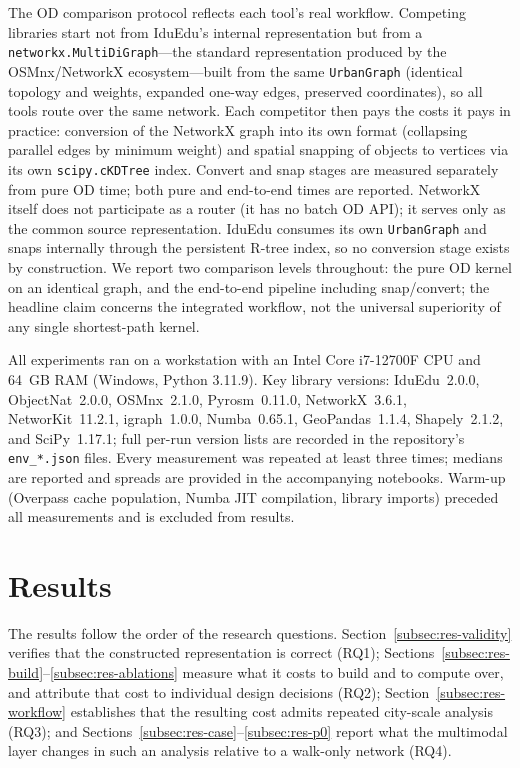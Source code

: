 \documentclass[smartcities,article,submit,moreauthors]{Definitions/mdpi}
\begin{document}
    The OD comparison protocol reflects each tool's real workflow.
    Competing libraries start not from IduEdu's internal representation but from a
    \texttt{networkx.MultiDiGraph}---the standard representation produced by the OSMnx/NetworkX
    ecosystem---built from the same \texttt{UrbanGraph} (identical topology and weights, expanded
    one-way edges, preserved coordinates), so all tools route over the same network.
    Each competitor then pays the costs it pays in practice: conversion of the NetworkX graph into its
    own format (collapsing parallel edges by minimum weight) and spatial snapping of objects to vertices
    via its own \texttt{scipy.cKDTree} index.
    Convert and snap stages are measured separately from pure OD time; both pure and end-to-end times
    are reported.
    NetworkX itself does not participate as a router (it has no batch OD API); it serves only as the
    common source representation.
    IduEdu consumes its own \texttt{UrbanGraph} and snaps internally through the persistent R-tree
    index, so no conversion stage exists by construction.
    We report two comparison levels throughout: the pure OD kernel on an identical graph, and the
    end-to-end pipeline including snap/convert; the headline claim concerns the integrated workflow, not
    the universal superiority of any single shortest-path kernel.

    All experiments ran on a workstation with an Intel Core i7-12700F CPU and 64~GB RAM (Windows,
    Python 3.11.9).
    Key library versions: IduEdu~2.0.0, ObjectNat~2.0.0, OSMnx~2.1.0, Pyrosm~0.11.0, NetworkX~3.6.1,
    NetworKit~11.2.1, igraph~1.0.0, Numba~0.65.1, GeoPandas~1.1.4, Shapely~2.1.2, and SciPy~1.17.1;
    full per-run version lists are recorded in the repository's \texttt{env\_*.json} files.
    Every measurement was repeated at least three times; medians are reported and spreads are provided
    in the accompanying notebooks.
    Warm-up (Overpass cache population, Numba JIT compilation, library imports) preceded all
    measurements and is excluded from results.



    \section{Results}
    \label{sec:results}

    The results follow the order of the research questions.
    Section~\ref{subsec:res-validity} verifies that the constructed representation is correct (RQ1);
    Sections~\ref{subsec:res-build}--\ref{subsec:res-ablations} measure what it costs to build and to
    compute over, and attribute that cost to individual design decisions (RQ2);
    Section~\ref{subsec:res-workflow} establishes that the resulting cost admits repeated city-scale
    analysis (RQ3); and Sections~\ref{subsec:res-case}--\ref{subsec:res-p0} report what the multimodal
    layer changes in such an analysis relative to a walk-only network (RQ4).
\end{document}
